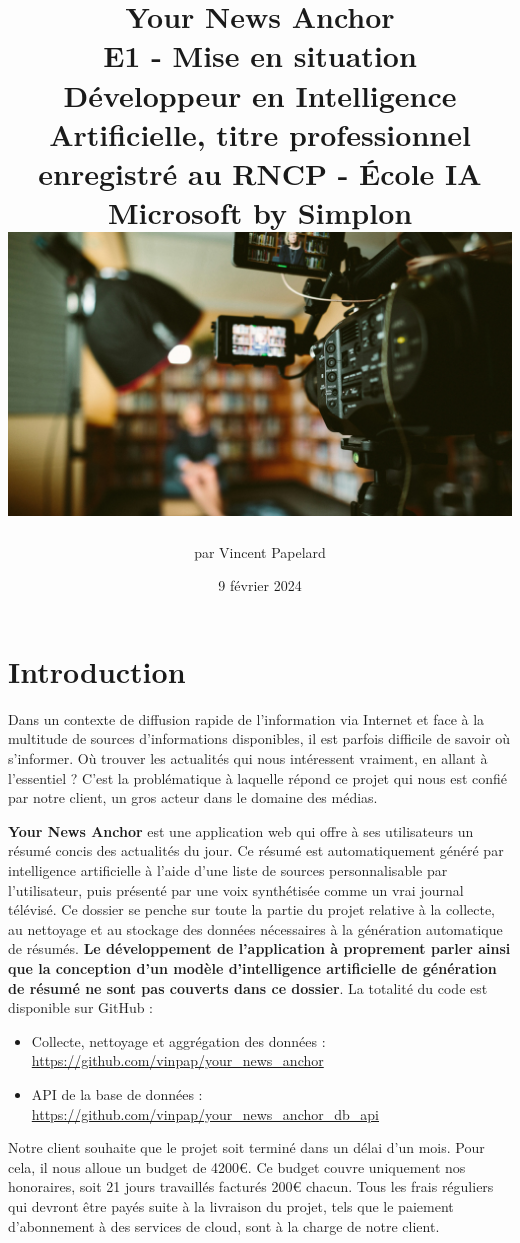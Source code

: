 \documentclass[french]{article}
\title{%
    \huge Your News Anchor  \\
    \bigskip
    \large E1 - Mise en situation \\ 
    Développeur en Intelligence Artificielle,
    titre professionnel enregistré au RNCP - École IA Microsoft by Simplon
    \vfill
    \includegraphics[width=14cm]{cover.jpg} 
    \vfill}
\date{9 février 2024}
\author{par Vincent Papelard}
\begin{document}
    \renewcommand{\contentsname}{Table des Matières}
    \maketitle
    \newpage
    \tableofcontents
    \newpage

    \section*{Introduction}
    Dans un contexte de diffusion rapide de l'information via Internet et face à la multitude de sources d'informations disponibles, il est parfois difficile de savoir où s'informer. Où trouver les actualités qui nous intéressent vraiment, en allant à l'essentiel ? C'est la problématique à laquelle répond ce projet qui nous est confié par notre client, un gros acteur dans le domaine des médias.
    
    \textbf{Your News Anchor} est une application web qui offre à ses utilisateurs un résumé concis des actualités du jour. Ce résumé est automatiquement généré par intelligence artificielle à l'aide d'une liste de sources personnalisable par l'utilisateur, puis présenté par une voix synthétisée comme un vrai journal télévisé.
    Ce dossier se penche sur toute la partie du projet relative à la collecte, au nettoyage et au stockage des données nécessaires à la génération automatique de résumés. \textbf{Le développement de l'application à proprement parler ainsi que la conception d'un modèle d'intelligence artificielle de génération de résumé ne sont pas couverts dans ce dossier}.
    La totalité du code est disponible sur GitHub :
    \begin{itemize}
        \item Collecte, nettoyage et aggrégation des données : \url{https://github.com/vinpap/your_news_anchor}
        \item API de la base de données : \url{https://github.com/vinpap/your_news_anchor_db_api}
    \end{itemize}

    Notre client souhaite que le projet soit terminé dans un délai d'un mois. Pour cela, il nous alloue un budget de 4200€. Ce budget couvre uniquement nos honoraires, soit 21 jours travaillés facturés 200€ chacun. Tous les frais réguliers qui devront être payés suite à la livraison du projet, tels que le paiement d'abonnement à des services de cloud, sont à la charge de notre client. 
\end{document}
